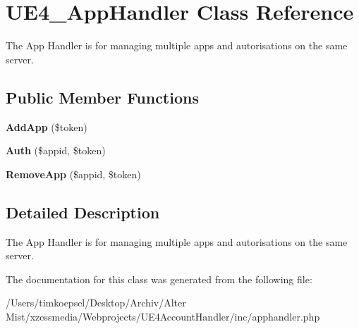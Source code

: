 \hypertarget{class_u_e4___app_handler}{\section{U\-E4\-\_\-\-App\-Handler Class Reference}
\label{class_u_e4___app_handler}
}


The App Handler is for managing multiple apps and autorisations on the same server.  


\subsection*{Public Member Functions}
\begin{DoxyCompactItemize}
\item 
\hypertarget{class_u_e4___app_handler_a919f9fd314bea09db6a45a5f2bf4b28f}{{\bfseries Add\-App} (\$token)}\label{class_u_e4___app_handler_a919f9fd314bea09db6a45a5f2bf4b28f}

\item 
\hypertarget{class_u_e4___app_handler_a2de878e2040a5f01b8537a159cde6b91}{{\bfseries Auth} (\$appid, \$token)}\label{class_u_e4___app_handler_a2de878e2040a5f01b8537a159cde6b91}

\item 
\hypertarget{class_u_e4___app_handler_a94694c6eb18f42b9ae57fb363541c3f4}{{\bfseries Remove\-App} (\$appid, \$token)}\label{class_u_e4___app_handler_a94694c6eb18f42b9ae57fb363541c3f4}

\end{DoxyCompactItemize}


\subsection{Detailed Description}
The App Handler is for managing multiple apps and autorisations on the same server. 

The documentation for this class was generated from the following file\-:\begin{DoxyCompactItemize}
\item 
/\-Users/timkoepsel/\-Desktop/\-Archiv/\-Alter Mist/xzessmedia/\-Webprojects/\-U\-E4\-Account\-Handler/inc/apphandler.\-php\end{DoxyCompactItemize}

